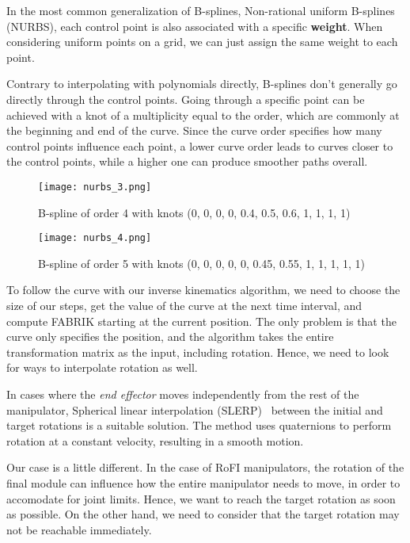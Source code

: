 In the most common generalization of B-splines, Non-rational uniform B-splines (NURBS), each control point is also associated with a specific \textbf{weight}. When considering uniform points on a grid, we can just assign the same weight to each point.

Contrary to interpolating with polynomials directly, B-splines don't generally go directly through the control points. Going through a specific point can be achieved with a knot of a multiplicity equal to the order, which are commonly at the beginning and end of the curve. Since the curve order specifies how many control points influence each point, a lower curve order leads to curves closer to the control points, while a higher one can produce smoother paths overall.

\begin{figure}
  \centering
  \texttt{[image: nurbs\_3.png]}
  \caption{B-spline of order 4 with knots (0, 0, 0, 0, 0.4, 0.5, 0.6, 1, 1, 1, 1)}
\end{figure}

\begin{figure}
  \centering
  \texttt{[image: nurbs\_4.png]}
  \caption{B-spline of order 5 with knots (0, 0, 0, 0, 0, 0.45, 0.55, 1, 1, 1, 1, 1)}
\end{figure}

To follow the curve with our inverse kinematics algorithm, we need to choose the size of our steps, get the value of the curve at the next time interval, and compute FABRIK starting at the current position. The only problem is that the curve only specifies the position, and the algorithm takes the entire transformation matrix as the input, including rotation. Hence, we need to look for ways to interpolate rotation as well.

In cases where the \textit{end effector} moves independently from the rest of the manipulator, Spherical linear interpolation (SLERP)~\cite{slerp} between the initial and target rotations is a suitable solution. The method uses quaternions to perform rotation at a constant velocity, resulting in a smooth motion.

Our case is a little different. In the case of RoFI manipulators, the rotation of the final module can influence how the entire manipulator needs to move, in order to accomodate for joint limits. Hence, we want to reach the target rotation as soon as possible. On the other hand, we need to consider that the target rotation may not be reachable immediately.
